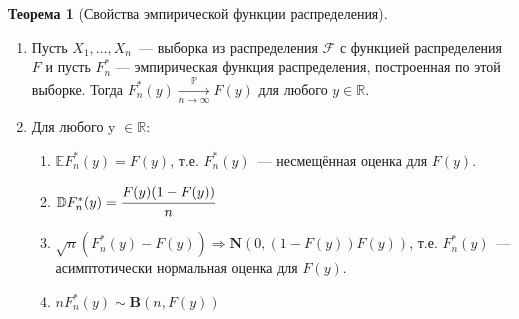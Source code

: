 \documentclass[oneside,final,14pt]{extreport}
\theoremstyle{plain}
\theoremstyle{definition}
\theoremstyle{named}
\newtheorem*{namedthm}{Теорема}
\begin{document}
\begin{namedthm}[Свойства эмпирической функции распределения]\leavevmode
\begin{enumerate}
    \item Пусть $X_{1}, \ldots, X_{n}$~--- выборка из распределения $\mathcal{F}$ с функцией распределения $F$ и пусть $F_{n}^{*}$ — эмпирическая функция распределения, построенная по этой выборке. Тогда $F_{n}^{*}(y) \xrightarrow[n \to \infty]{\mathbb{P}} F(y)$ для любого $y \in \mathbb{R}.$
    \item Для любого y $\in \mathbb{R}$:
    \begin{enumerate}[label={\arabic*)}]
        \item $\mathbb{E} F_{n}^{*}(y)=F(y)$, т.е. $F_{n}^{*}(y)$~--- несмещённая оценка для $F(y)$.
        \item $\mathbb{D} F_{n}^{*}(y)=\cfrac{F(y)(1-F(y))}{n}$
        \item $\sqrt{n}(F_{n}^{*}(y)-F(y)) \Rightarrow \mathbf{N}(0, (1-F(y))F(y))$, т.е. $F_{n}^{*}(y)$~--- асимптотически нормальная оценка для $F(y)$.
        \item $n F_{n}^{*}(y) \sim \mathbf{B}(n, F(y))$
    \end{enumerate}
\end{enumerate}
\end{namedthm}
\pagebreak
\end{document}
